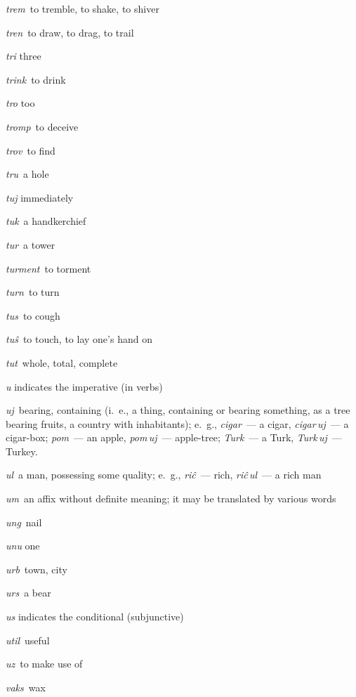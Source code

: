 \begin{landscape}
\begin{multicols}{5}
\begin{outdent}{1em}
\emph{trem\,} to tremble, to shake, to shiver

\emph{tren\,} to draw, to drag, to trail

\emph{tri} three

\emph{trink\,} to drink

\emph{tro} too

\emph{tromp\,} to deceive

\emph{trov\,} to find

\emph{tru\,} a hole

\emph{tuj} immediately

\emph{tuk\,} a handkerchief

\emph{tur\,} a tower

\emph{turment\,} to torment

\emph{turn\,} to turn

\emph{tus\,} to cough

\emph{tuŝ\,} to touch, to lay one’s hand on 

\emph{tut\,} whole, total, complete
\end{outdent}


\begin{outdent}{1em}
\emph{u} indicates the imperative (in verbs)

\emph{uj\,} bearing, containing (i.~e., a thing, containing
or bearing something, as a tree bearing fruits, a country with inhabitants);
e.~g., \emph{cigar\,} — a cigar, \emph{cigar\,uj\,} — a cigar-box; \emph{pom\,} — an apple, \emph{pom\,uj\,} — apple-tree; \emph{Turk\,} — a Turk, \emph{Turk\,uj\,} — Turkey.

\emph{ul\,} a man, possessing some quality; e.~g., \emph{riĉ\,} — rich, \emph{riĉ\,ul\,} — a rich man

\emph{um\,} an affix without definite meaning; it may be translated by various words

\emph{ung\,} nail

\emph{unu} one

\emph{urb\,} town, city

\emph{urs\,} a bear

\emph{us} indicates the conditional (subjunctive)

\emph{util\,} useful

\emph{uz\,} to make use of 
\end{outdent}

%
\columnbreak


\begin{outdent}{1em}
\emph{vaks\,} wax


\end{outdent}
\end{multicols}
\end{landscape}

